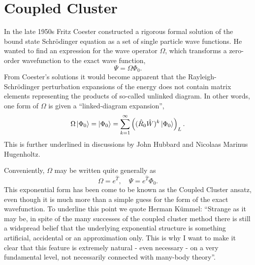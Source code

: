 \chapter{Coupled Cluster}
\label{ch:coupled_cluster_theory}

In the late 1950s Fritz Coester constructed a rigorous formal solution of the bound
state Schrödinger equation as a set of single particle wave
functions\cite{coester1958bound}. He wanted to find an expression for the wave operator 
$\Omega$, which transforms a zero-order wavefunction to the exact wave function,
\begin{equation}
    \Psi = \Omega \Phi_0.
\end{equation}
From Coester's solutions it would become apparent that the Rayleigh-Schrödinger 
perturbation expansions of the energy does not contain matrix elements representing 
the products of so-called unlinked diagram. In other words, one form of $\Omega$ is 
given a ``linked-diagram expansion'',
\begin{equation}
    \Omega\ket{\Phi_0} = \ket{\Phi_0} 
    = \sum_{k=1}^\infty\left((\hat{R}_0\hat{W})^k \ket{{\Phi_0}} \right)_L.
\end{equation}
This is further underlined in discussions by John Hubbard\cite{hubbard1957description}
and Nicolaas Marinus Hugenholtz\cite{hugenholtz1957perturbation}.

Conveniently, $\Omega$ may be written quite generally as
\begin{equation}
    \Omega = e^{\hat{T}}, \quad \Psi = e^{\hat{T}}\Phi_0.
\end{equation}
This exponential form has been come to be known as the Coupled Cluster ansatz, even 
though it is much more than a simple guess for the form of the exact wavefunction.
To underline this point we quote Herman Kümmel: ``Strange as it may be, in spite of
the many successes of the coupled cluster method there is still a widspread belief
that the underlying exponential structure is something artificial, accidental or 
an approximation only. This is why I want to make it clear that this feature is 
extremely natural - even necessary - on a very fundamental level, not necessarily
connected with many-body theory''\cite{kummel1991origins}. 

